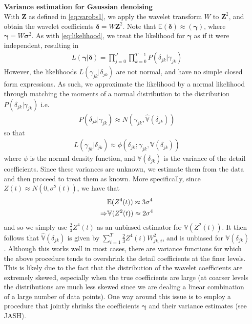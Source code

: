 \documentclass[12pt]{article}
\newcommand{\Gg}{\gamma}     \newcommand{\GG}{\Gamma}
\newcommand{\Gd}{\delta}     \newcommand{\GD}{\Delta}
\newcommand{\s}{\sigma}
\begin{document}
\begin{appendices}
\section{}\label{app:var estimation}\bigskip
\textbf{Variance estimation for Gaussian denoising}\bigskip\\
With $\bm{Z}$ as defined in \eqref{eq:varobs1}, we apply the wavelet transform $W$ to $\bm{Z}^2$, and obtain the wavelet coefficients $\bm{\Gd}=W\bm{Z}^2$. Note that $\mathbb{E}(\bm{\Gd})\approx(\bm{\Gg})$, where $\bm{\Gg}=W\bm{\s}^2$. As with \eqref{eq:likelihood}, we treat the likelihood for $\bm{\Gg}$ as if it were independent, resulting in
\begin{eqnarray}
L(\bm{\Gg}|\bm{\Gd})=\prod_{j=0}^J\prod_{k=0}^{T-1}P(\Gd_{jk}|\Gg_{jk})
\end{eqnarray}
However, the likelihoods $L(\Gg_{jk}|\Gd_{jk})$ are not normal, and have no simple closed form expressions. As such, we approximate the likelihood by a normal likelihood through matching the moments of a normal distribution to the distribution $P(\Gd_{jk}|\Gg_{jk})$ i.e.
\begin{eqnarray}
P(\Gd_{jk}|\Gg_{jk})\approx N(\Gg_{jk},\hat{\mathbb{V}}(\Gd_{jk}))
\end{eqnarray}
so that
\begin{eqnarray}\label{eq:gaus approx}
L(\Gg_{jk}|\Gd_{jk})\approx \phi(\Gd_{jk};\Gg_{jk},\mathbb{V}(\Gd_{jk}))
\end{eqnarray}
where $\phi$ is the normal density function, and $\mathbb{V}(\Gd_{jk})$ is the variance of the detail coefficients. Since these variances are unknown, we estimate them from the data and then proceed to treat them as known. More specifically, since $Z(t)\approx N(0,\s^2(t))$, we have that
\begin{eqnarray}
&\mathbb{E}(Z^4(t))\approx 3\s^4\notag\\
\label{eq:varvarest}\Rightarrow&\mathbb{V}(Z^2(t))\approx 2\s^4
\end{eqnarray}
and so we simply use $\frac{2}{3}Z^4(t)$ as an unbiased estimator for $\mathbb{V}(Z^2(t))$. It then follows that $\hat{\mathbb{V}}(\Gd_{jk})$ is given by $\sum_{i=1}^T \frac{2}{3}Z^4(i)W_{jk,i}^2$, and is unbiased for $\mathbb{V}(\Gd_{jk})$. Although this works well in most cases, there are variance functions for which the above procedure tends to overshrink the detail coefficients at the finer levels. This is likely due to the fact that the distribution of the wavelet coefficients are extremely skewed, especially when the true coefficients are large (at coarser levels the distributions are much less skewed since we are dealing a linear combination of a large number of data points). One way around this issue is to employ a procedure that jointly shrinks the coefficients $\bm{\Gg}$ and their variance estimates (see JASH).\bigskip\\

\end{appendices}
\end{document}
